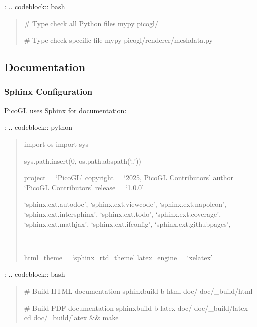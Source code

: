 \documentclass[a4paper,10pt,english,openany,oneside]{sphinxmanual}
\begin{document}
\sphinxAtStartPar
{}:
.. code\sphinxhyphen{}block:: bash
\begin{quote}

\sphinxAtStartPar
\# Type check all Python files
mypy picogl/

\sphinxAtStartPar
\# Type check specific file
mypy picogl/renderer/meshdata.py
\end{quote}


\subsection{Documentation}
\label{\detokenize{development:documentation}}

\subsubsection{Sphinx Configuration}
\label{\detokenize{development:sphinx-configuration}}
\sphinxAtStartPar
PicoGL uses Sphinx for documentation:

\sphinxAtStartPar
{}:
.. code\sphinxhyphen{}block:: python
\begin{quote}

\sphinxAtStartPar
import os
import sys

\sphinxAtStartPar
sys.path.insert(0, os.path.abspath(‘..’))

\sphinxAtStartPar
project = ‘PicoGL’
copyright = ‘2025, PicoGL Contributors’
author = ‘PicoGL Contributors’
release = ‘1.0.0’
\begin{description}
\sphinxlineitem{extensions = {[}}
\sphinxAtStartPar
‘sphinx.ext.autodoc’,
‘sphinx.ext.viewcode’,
‘sphinx.ext.napoleon’,
‘sphinx.ext.intersphinx’,
‘sphinx.ext.todo’,
‘sphinx.ext.coverage’,
‘sphinx.ext.mathjax’,
‘sphinx.ext.ifconfig’,
‘sphinx.ext.githubpages’,

\end{description}

\sphinxAtStartPar
{]}

\sphinxAtStartPar
html\_theme = ‘sphinx\_rtd\_theme’
latex\_engine = ‘xelatex’
\end{quote}

\sphinxAtStartPar
{}:
.. code\sphinxhyphen{}block:: bash
\begin{quote}

\sphinxAtStartPar
\# Build HTML documentation
sphinx\sphinxhyphen{}build \sphinxhyphen{}b html doc/ doc/\_build/html

\sphinxAtStartPar
\# Build PDF documentation
sphinx\sphinxhyphen{}build \sphinxhyphen{}b latex doc/ doc/\_build/latex
cd doc/\_build/latex \&\& make
\end{quote}
\end{document}

